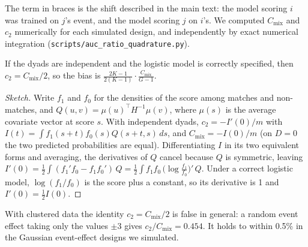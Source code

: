 The term in braces is the shift described in the main text: the model scoring $i$ was trained on $j$'s event, and the
model scoring $j$ on $i$'s. We computed $C_{\mathrm{mix}}$ and $c_2$ numerically for each simulated design, and independently by
exact numerical integration (\texttt{scripts/auc\_ratio\_quadrature.py}).

\begin{prop}\label{prop:half}
If the dyads are independent and the logistic model is correctly specified, then $c_2=C_{\mathrm{mix}}/2$, so the bias is
$\frac{2K-1}{2(K-1)}\cdot\frac{C_{\mathrm{mix}}}{G-1}$.
\end{prop}

\begin{proof}[Sketch]
Write $f_1$ and $f_0$ for the densities of the score among matches and non-matches, and $Q(u,v)=\mu(u)^\top H^{-1}\mu(v)$, where
$\mu(s)$ is the average covariate vector at score $s$. With independent dyads, $c_2=-I'(0)/m$ with
$I(t)=\int f_1(s+t)f_0(s)Q(s+t,s)\,ds$, and $C_{\mathrm{mix}}=-I(0)/m$ (on $D=0$ the two predicted probabilities are equal).
Differentiating $I$ in its two
equivalent forms and averaging, the derivatives of $Q$ cancel because $Q$ is symmetric, leaving
$I'(0)=\frac12\int (f_1'f_0-f_1f_0')\,Q=\frac12\int f_1f_0\,\big(\log\tfrac{f_1}{f_0}\big)'\,Q$. Under a correct logistic model,
$\log(f_1/f_0)$ is the score plus a constant, so its derivative is 1 and $I'(0)=\frac12 I(0)$.
\end{proof}

With clustered data the identity $c_2=C_{\mathrm{mix}}/2$ is false in general: a random event effect taking only the values
$\pm3$ gives $c_2/C_{\mathrm{mix}}=0.454$. It holds to within 0.5\% in the Gaussian event-effect designs we simulated.
